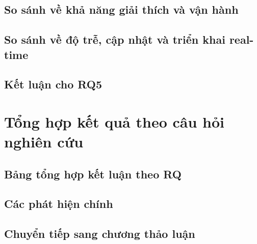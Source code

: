 \subsection{So sánh về khả năng giải thích và vận hành}
\label{subsec:rq5-interpretability-operation-comparison}

\subsection{So sánh về độ trễ, cập nhật và triển khai real-time}
\label{subsec:rq5-latency-update-deployment-comparison}

\subsection{Kết luận cho RQ5}
\label{subsec:rq5-conclusion}

\section{Tổng hợp kết quả theo câu hỏi nghiên cứu}
\label{sec:results-summary-by-rq}

\subsection{Bảng tổng hợp kết luận theo RQ}
\label{subsec:summary-rq-conclusions}

\subsection{Các phát hiện chính}
\label{subsec:summary-main-findings}

\subsection{Chuyển tiếp sang chương thảo luận}
\label{subsec:summary-transition-to-discussion}
